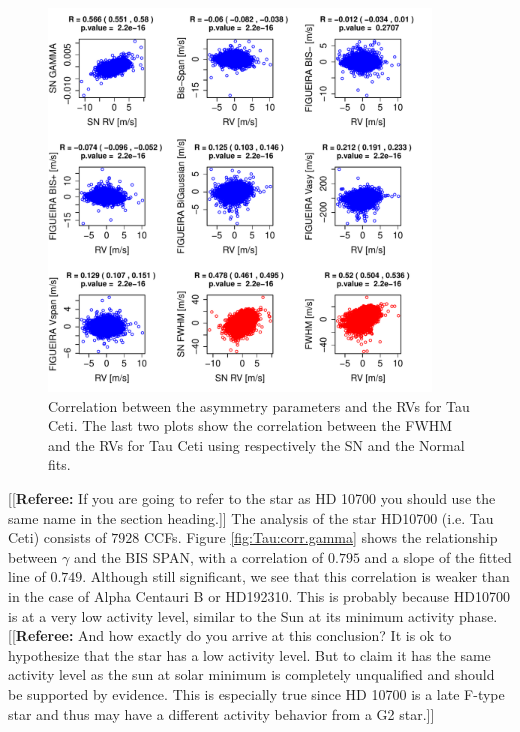 \documentclass[11pt, oneside]{article}
\newcommand{\comment}[1]{{\color{red}[[\textbf{Referee: }#1]]}}
\begin{document}
%
\begin{figure}[htbp]
   \centering
\includegraphics[height = 4in]{HD10700_[4]Comparison_para.pdf}  
   \caption{Correlation between the asymmetry parameters and the RVs for Tau Ceti. The last two plots show the correlation between the FWHM and the RVs for Tau Ceti using respectively the SN and the Normal fits.}
   \label{fig:Tau:corrPlot}
\end{figure}

\iffalse
\comment{If you are going to refer to the star as HD 10700 you should use the same name in the section heading.}
The analysis of the star HD10700 (i.e. Tau Ceti) consists of $7928$ CCFs. Figure \ref{fig:Tau:corr.gamma} shows the relationship between $\gamma$ and the BIS SPAN, with a correlation of $0.795$ and a slope of the fitted line of $0.749$. Although still significant, we see that this correlation is weaker than in the case of Alpha Centauri B or HD192310. This is probably because HD10700 is at a very low activity level, similar to the Sun at its minimum activity phase.
\comment{And how exactly do you arrive at this conclusion? It is ok to hypothesize that the star has a low activity level. But to claim it has the same activity level as the sun at solar minimum is completely unqualified and should be supported by evidence. This is especially true since HD 10700 is a late F-type star and thus may have a different activity behavior from a G2 star.}
\end{document}
